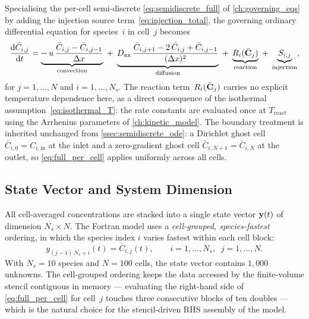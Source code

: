 Specialising the per-cell semi-discrete \cref{eq:semidiscrete_full} of \cref{ch:governing_eqs} by adding the injection source term~\eqref{eq:injection_total}, the governing ordinary differential equation for species~\(i\) in cell~\(j\) becomes
%
\begin{equation}
  \frac{\mathrm{d}\bar{C}_{i,j}}{\mathrm{d}t}
  = \underbrace{-\,u\,\frac{\bar{C}_{i,j} - \bar{C}_{i,j-1}}{\Delta x}}_{\text{convection}}
  \;+\; \underbrace{D_{\mathrm{ax}}\,\frac{\bar{C}_{i,j+1} - 2\,\bar{C}_{i,j} + \bar{C}_{i,j-1}}{(\Delta x)^{2}}}_{\text{diffusion}}
  \;+\; \underbrace{R_i(\bar{\mathbf{C}}_j)}_{\text{reaction}}
  \;+\; \underbrace{S_{i,j}}_{\text{injection}},
  \label{eq:full_per_cell}
\end{equation}
%
for \(j = 1, \ldots, N\) and \(i = 1, \ldots, N_s\). The reaction term~\(R_i(\bar{\mathbf{C}}_j)\) carries no explicit temperature dependence here, as a direct consequence of the isothermal assumption~\eqref{eq:isothermal_T}: the rate constants are evaluated once at \(T_{\mathrm{react}}\) using the Arrhenius parameters of \cref{ch:kinetic_model}. The boundary treatment is inherited unchanged from \cref{ssec:semidiscrete_ode}: a Dirichlet ghost cell \(\bar{C}_{i,0} = C_{i,\mathrm{in}}\) at the inlet and a zero-gradient ghost cell \(\bar{C}_{i,N+1} = \bar{C}_{i,N}\) at the outlet, so \cref{eq:full_per_cell} applies uniformly across all cells.

\subsection{State Vector and System Dimension}\label{ssec:state_vector}

All cell-averaged concentrations are stacked into a single state vector \(\mathbf{y}(t)\) of dimension \(N_s \times N\). The Fortran model uses a \emph{cell-grouped, species-fastest} ordering, in which the species index \(i\) varies fastest within each cell block:
%
\begin{equation}
  y_{(j-1)\,N_s + i}(t) = \bar{C}_{i,j}(t),
  \qquad i = 1, \ldots, N_s,
  \;\; j = 1, \ldots, N.
  \label{eq:state_vector_ordering}
\end{equation}
%
With \(N_s = 10\) species and \(N = 100\) cells, the state vector contains \(1{,}000\) unknowns. The cell-grouped ordering keeps the data accessed by the finite-volume stencil contiguous in memory --- evaluating the right-hand side of \cref{eq:full_per_cell} for cell~\(j\) touches three consecutive blocks of ten doubles --- which is the natural choice for the stencil-driven RHS assembly of the model.

